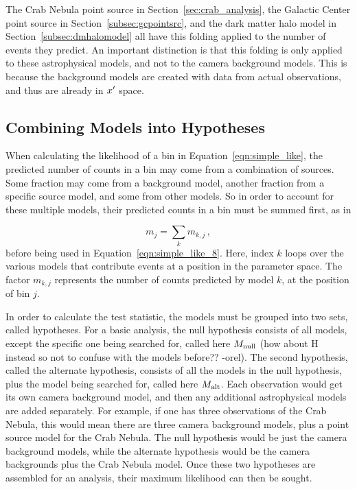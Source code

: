   The Crab Nebula point source in Section~\ref{sec:crab_analysis}, the Galactic Center point source in Section~\ref{subsec:gcpointsrc}, and the dark matter halo model in Section~\ref{subsec:dmhalomodel} all have this folding applied to the number of events they predict.
  An important distinction is that this folding is only applied to these astrophysical models, and not to the camera background models.
  This is because the background models are created with data from actual observations, and thus are already in $x'$ space.
  
  \subsection{Combining Models into Hypotheses}\label{subsec:hypotheses}
  
  When calculating the likelihood of a bin in Equation~\ref{eqn:simple_like}, the predicted number of counts in a bin may come from a combination of sources.
  Some fraction may come from a background model, another fraction from a specific source model, and some from other models.
  So in order to account for these multiple models, their predicted counts in a bin must be summed first, as in 
  
  \begin{equation}\label{eqn:combinemodels}
    m_{j} = \sum_k m_{k,j} \,,
  \end{equation}
  before being used in Equation~\ref{eqn:simple_like_8}.
  Here, index $k$ loops over the various models that contribute events at a position in the parameter space.
  The factor $m_{k,j}$ represents the number of counts predicted by model $k$, at the position of bin $j$.
  
  In order to calculate the test statistic, the models must be grouped into two sets, called hypotheses.
  For a basic analysis, the null hypothesis consists of all models, except the specific one being searched for, called here {\color{red} $M_\textrm{null}$ (how about H instead so not to confuse with the models before?? -orel)}.
  The second hypothesis, called the alternate hypothesis, consists of all the models in the null hypothesis, plus the model being searched for, called here $M_\textrm{alt}$.
  Each observation would get its own camera background model, and then any additional astrophysical models are added separately.
  For example, if one has three observations of the Crab Nebula, this would mean there are three camera background models, plus a point source model for the Crab Nebula.
  The null hypothesis would be just the camera background models, while the alternate hypothesis would be the camera backgrounds plus the Crab Nebula model.
  Once these two hypotheses are assembled for an analysis, their maximum likelihood can then be sought.
  
